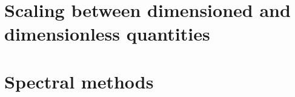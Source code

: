 \section{Scaling between dimensioned and dimensionless quantities} 

\newpage %
\section{Spectral methods} 




